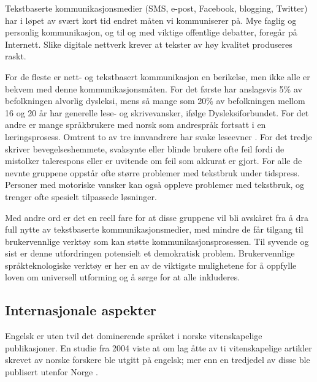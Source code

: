 \begin{multicols}{2}

Tekstbaserte kommunikasjonsmedier (SMS, e-post, Facebook, blogging, Twitter) har i løpet av svært kort tid endret måten vi kommuniserer på. 
Mye faglig og personlig kommunikasjon, og til og med viktige offentlige debatter, foregår på Internett. Slike digitale nettverk krever at tekster av høy kvalitet produseres raskt.

For de fleste er nett- og tekstbasert kommunikasjon en berikelse, men ikke alle er bekvem med denne kommunikasjonsmåten. 
For det første har anslagsvis 5\% av befolkningen alvorlig dysleksi, mens så mange som 20\% av befolkningen mellom 16 og 20 år har generelle lese- og skrivevansker, ifølge Dysleksiforbundet. 
For det andre er mange språkbrukere med norsk som andrespråk fortsatt i en læringsprosess. 
Omtrent to av tre innvandrere har svake leseevner \cite{gabrielsen2007}.
For det tredje skriver bevegelseshemmete, svaksynte eller blinde brukere ofte feil fordi de mistolker talerespons eller er uvitende om feil som akkurat er gjort. 
For alle de nevnte gruppene oppstår ofte større problemer med tekstbruk under tidspress. 
Personer med motoriske vansker kan også oppleve problemer med tekstbruk, og trenger ofte spesielt tilpassede løsninger.

Med andre ord er det en reell fare for at disse gruppene vil bli avskåret fra å dra full nytte av tekstbaserte kommunikasjonsmedier, med mindre de får tilgang til brukervennlige verktøy som kan støtte kommunikasjonsprosessen. 
Til syvende og sist er denne utfordringen potensielt et demokratisk problem. 
Brukervennlige språkteknologiske verktøy er her en av de viktigste mulighetene for å oppfylle loven om universell utforming og å sørge for at alle inkluderes.

\subsection{Internasjonale aspekter}

Engelsk er uten tvil det dominerende språket i norske vitenskapelige publikasjoner. En studie fra 2004 viste at om lag åtte av ti vitenskapelige artikler skrevet av norske forskere ble utgitt på engelsk; mer enn en tredjedel av disse ble publisert utenfor Norge \cite{schwach2004}.


\end{multicols}
